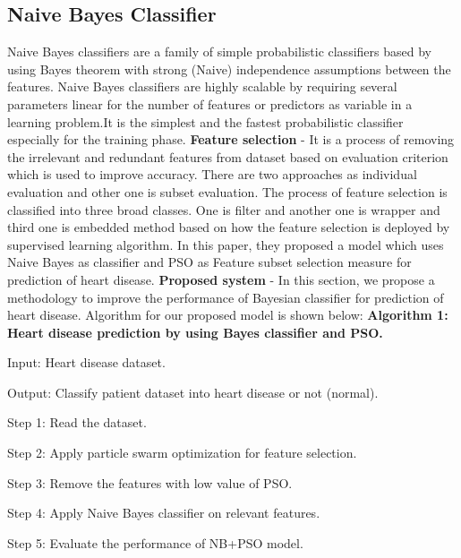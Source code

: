 \documentclass{book}
\begin{document}
    \subsection{Naive Bayes Classifier}
    Naive Bayes classifiers are a family of simple probabilistic classifiers based by using Bayes theorem with strong (Naive) independence assumptions between the features. Naive Bayes classifiers are highly scalable by requiring several parameters linear for the number of features or predictors as variable in a learning problem.It is the simplest and the fastest probabilistic classifier especially for the training phase.	
    \linebreak
    \linebreak				
    \textbf{Feature selection} - It is a process of removing the irrelevant and redundant features from dataset based on evaluation criterion which is used to improve accuracy. There are two approaches as individual evaluation and other one is subset evaluation. The process of feature selection is classified into three broad classes. One is filter and another one is wrapper and third one is embedded method based on how the feature selection is deployed by supervised learning algorithm. In this paper, they proposed a model which uses Naive Bayes as classifier and PSO as Feature subset selection measure for prediction of heart disease.
    \linebreak
    \linebreak				
    \textbf{Proposed system} - In this section, we propose a methodology to improve the performance of Bayesian classifier for prediction of heart disease. Algorithm for our proposed model is shown below:
    \linebreak
    \linebreak
    \textbf{Algorithm 1: Heart disease prediction by using Bayes classifier and PSO.}
   	
    Input: Heart disease dataset.
    
    Output: Classify patient dataset into heart disease or not (normal).
    		
    Step 1: Read the dataset.
    
    Step 2: Apply particle swarm optimization for feature selection. 
    
    Step 3: Remove the features with low value of PSO.
    
    Step 4: Apply Naive Bayes classifier on relevant features. 
    
    Step 5: Evaluate the performance of NB+PSO model.
    
\end{document}
